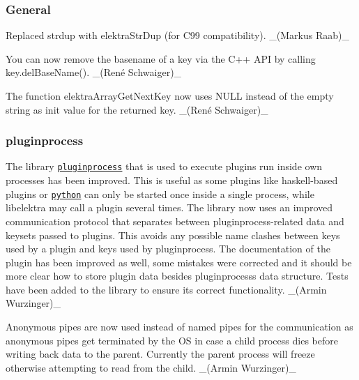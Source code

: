 \subsubsection*{General}


\begin{DoxyItemize}
\item Replaced {\ttfamily strdup} with {\ttfamily elektra\+Str\+Dup} (for C99 compatibility). \+\_\+(\+Markus Raab)\+\_\+
\item You can now remove the basename of a key via the C++ A\+PI by calling {\ttfamily key.\+del\+Base\+Name()}. \+\_\+(René Schwaiger)\+\_\+
\item The function {\ttfamily elektra\+Array\+Get\+Next\+Key} now uses {\ttfamily N\+U\+LL} instead of the empty string as init value for the returned key. \+\_\+(René Schwaiger)\+\_\+
\end{DoxyItemize}

\subsubsection*{pluginprocess}


\begin{DoxyItemize}
\item The library \href{http://master.libelektra.org/src/libs/pluginprocess}{\tt {\ttfamily pluginprocess}} that is used to execute plugins run inside own processes has been improved. This is useful as some plugins like haskell-\/based plugins or \href{http://libelektra.org/plugins/python}{\tt {\ttfamily python}} can only be started once inside a single process, while libelektra may call a plugin several times. The library now uses an improved communication protocol that separates between pluginprocess-\/related data and keysets passed to plugins. This avoids any possible name clashes between keys used by a plugin and keys used by pluginprocess. The documentation of the plugin has been improved as well, some mistakes were corrected and it should be more clear how to store plugin data besides pluginprocess\textquotesingle{}s data structure. Tests have been added to the library to ensure its correct functionality. \+\_\+(\+Armin Wurzinger)\+\_\+
\item Anonymous pipes are now used instead of named pipes for the communication as anonymous pipes get terminated by the OS in case a child process dies before writing back data to the parent. Currently the parent process will freeze otherwise attempting to read from the child. \+\_\+(\+Armin Wurzinger)\+\_\+
\end{DoxyItemize}

